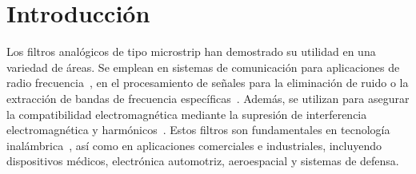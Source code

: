 \section{Introducción}
Los filtros analógicos de tipo microstrip han demostrado su utilidad en una variedad de áreas. Se emplean en sistemas de comunicación para aplicaciones de radio frecuencia~\cite{zhang2023multi}, en el procesamiento de señales para la eliminación de ruido o la extracción de bandas de frecuencia específicas~\cite{islam2021spectrum}. Además, se utilizan para asegurar la compatibilidad electromagnética mediante la supresión de interferencia electromagnética y harmónicos~\cite{kumar2023electromagnetic}. Estos filtros son fundamentales en tecnología inalámbrica~\cite{ibrahim2020compact}, así como en aplicaciones comerciales e industriales, incluyendo dispositivos médicos, electrónica automotriz, aeroespacial y sistemas de defensa.


